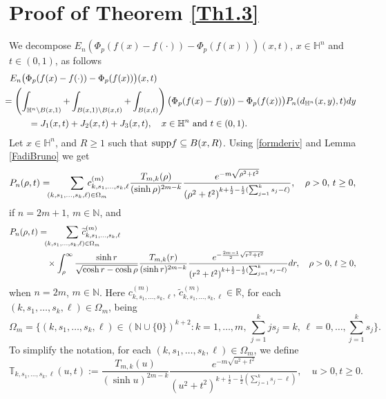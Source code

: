 \documentclass[a4paper,10pt, reqno]{amsart}
\theoremstyle{definition}
\theoremstyle{remark}
\numberwithin{equation}{section}
\begin{document}
{\section{Proof of Theorem \ref{Th1.3}}\label{S5}
We decompose $E_n(\Phi_p(f(x)-f(\cdot))-\Phi _p(f(x)))(x,t)$, $x\in \mathbb H^n$ and $t\in (0,1)$, as follows
\begin{align}\label{Epn}
 E_n\big(\Phi_p(f(x)-f(\cdot))-\Phi _p(f(x))\big)(x,t)&\nonumber\\
 &\hspace{-6cm}=\left(\int_{\mathbb H^n\setminus B(x,1)}+ \int_{B(x,1)\setminus B(x,t)}+\int_{B(x,t)}\right)\big(\Phi _p(f(x)-f(y))-\Phi _p(f(x))\big)P_n(d_{\mathbb H^n}(x,y),t)dy\nonumber\\
 &\hspace{-5cm}=J_1(x,t)+J_2(x,t)+J_3(x,t),\quad x\in \mathbb H^n\mbox{ and }t\in (0,1).
\end{align}
Let $x\in \mathbb H^n$, and $R\geq 1$ such that ${\rm supp }f\subseteq B(x,R)$. Using \eqref{formderiv} and Lemma \ref{FadiBruno} we get
$$
P_n(\rho ,t)=\hspace{-0.2cm}\sum_{(k, s_1,\ldots,s_k,\ell )\in \Omega_m}\hspace{-0.8cm}c_{k,s_1,\ldots, s_k,\ell}^{(m)}\frac{T_{m,k}(\rho )}{(\sinh \rho )^{2m-k}}\frac{e^{-m\sqrt{\rho ^2+t^2}}}{(\rho ^2+t^2)^{k+\frac{1}{2}-\frac{1}{2}(\sum_{j=1}^ks_j-\ell )}},\quad \rho >0,\,t\geq 0,
$$
if $n=2m+1$, $m\in \mathbb N$, and 
\begin{align*}
P_n(\rho ,t)&=\hspace{-0.2cm}\sum_{(k, s_1,\ldots,s_k,\ell )\in \Omega_m}\hspace{-0.8cm}\widetilde{c}_{k,s_1,\ldots, s_k,\ell}^{(m)}\\
&\quad \times \int_\rho ^\infty \frac{\sinh r}{\sqrt{\cosh r-\cosh \rho }}\frac{T_{m,k}(r)}{(\sinh r)^{2m-k}}\frac{e^{-\frac{2m-1}{2}\sqrt{r^2+t^2}}}{(r^2+t^2)^{k+\frac{1}{2}-\frac{1}{2}(\sum_{j=1}^ks_j-\ell )}}dr,\quad \rho >0,\,t\geq 0,
\end{align*}
 when $n=2m$, $m\in \mathbb N$. Here $c_{k,s_1,\ldots,s_k,\ell}^{(m)},\,\widetilde{c}_{k,s_1,\ldots, s_k,\ell}^{(m)}\in \mathbb R$, for each $(k,s_1,\ldots, s_k,\ell )\in \Omega_m$, being 
$$
 \Omega_m=\Big\{(k,s_1,\ldots, s_k,\ell)\in (\mathbb N\cup\{0\})^{k+2}:k=1,\ldots, m,\,\sum_{j=1}^kjs_j=k,\,\ell =0,\ldots, \sum_{j=1}^ks_j\Big\}.
$$
To simplify the notation, for each $(k,s_1,\ldots,s_k,\ell)\in \Omega _m$, we define
$$
\mathbb T_{k,s_1,\ldots, s_k,\ell}(u,t):=\frac{T_{m,k}(u)}{(\sinh u)^{2m-k}} \frac{e^{-m\sqrt{u^2+t^2}}}{(u^2+t^2)^{k+\frac{1}{2}-\frac{1}{2}(\sum_{j=1}^ks_j-\ell )}},\quad u>0,t\geq 0.
$$}
\end{document}
